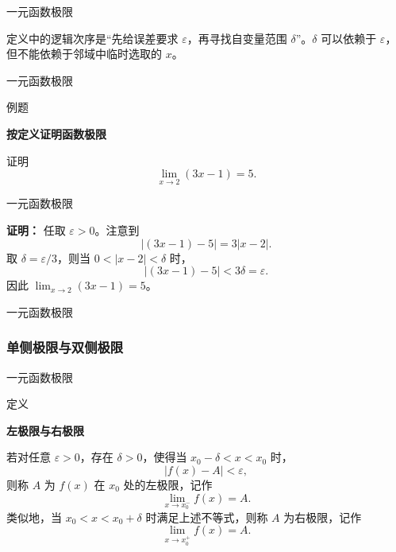 \documentclass[aspectratio=169,10pt,fontset=fandol]{ctexbeamer}
\newenvironment{custom}[1]{\par\noindent\textbf{#1}\quad}{\par\vspace{0.8em}}
\begin{document}
\begin{frame}[t,fragile]{一元函数极限}
\normalsize
{\normalsize
定义中的逻辑次序是“先给误差要求 \(\varepsilon\)，再寻找自变量范围 \(\delta\)”。\(\delta\) 可以依赖于 \(\varepsilon\)，但不能依赖于邻域中临时选取的 \(x\)。


}
\end{frame}
\begin{frame}[t,fragile]{一元函数极限}
\normalsize
\begin{block}{例题}
{\normalsize
\textbf{按定义证明函数极限}\par

证明
\[
\lim_{x\to2}(3x-1)=5.
\]

}
\end{block}
\end{frame}
\begin{frame}[t,fragile]{一元函数极限}
\normalsize
{\normalsize
\textbf{证明：}
任取 \(\varepsilon>0\)。注意到
\[
|(3x-1)-5|=3|x-2|.
\]
取 \(\delta=\varepsilon/3\)，则当 \(0<|x-2|<\delta\) 时，
\[
|(3x-1)-5|<3\delta=\varepsilon.
\]
因此 \(\lim_{x\to2}(3x-1)=5\)。

}
\end{frame}
\begin{frame}[t,fragile]{一元函数极限}
\normalsize
{\normalsize
\subsubsection*{单侧极限与双侧极限}


}
\end{frame}
\begin{frame}[t,fragile]{一元函数极限}
\normalsize
\begin{block}{定义}
{\normalsize
\textbf{左极限与右极限}\par

若对任意 \(\varepsilon>0\)，存在 \(\delta>0\)，使得当 \(x_0-\delta<x<x_0\) 时，
\[
|f(x)-A|<\varepsilon,
\]
则称 \(A\) 为 \(f(x)\) 在 \(x_0\) 处的左极限，记作
\[
\lim_{x\to x_0^-}f(x)=A.
\]
类似地，当 \(x_0<x<x_0+\delta\) 时满足上述不等式，则称 \(A\) 为右极限，记作
\[
\lim_{x\to x_0^+}f(x)=A.
\]

}
\end{block}
\end{frame}
\end{document}
